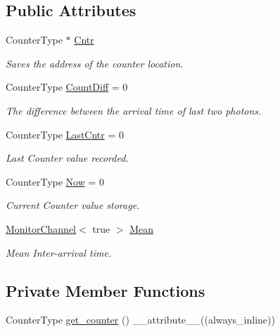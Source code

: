 \subsection*{Public Attributes}
\begin{DoxyCompactItemize}
\item 
Counter\+Type $\ast$ \hyperlink{classInterArrivalTime_a6873d0052064c8db918fd0a813524c6f}{Cntr}
\begin{DoxyCompactList}\small\item\em Saves the address of the counter location. \end{DoxyCompactList}\item 
Counter\+Type \hyperlink{classInterArrivalTime_ac73e4d6bbfc5daea67b53723ede5e9fd}{Count\+Diff} = 0
\begin{DoxyCompactList}\small\item\em The difference between the arrival time of last two photons. \end{DoxyCompactList}\item 
Counter\+Type \hyperlink{classInterArrivalTime_a8a24e1acb445c45b2934955fb0dcc8f5}{Last\+Cntr} = 0
\begin{DoxyCompactList}\small\item\em Last Counter value recorded. \end{DoxyCompactList}\item 
Counter\+Type \hyperlink{classInterArrivalTime_aa0126b0de317f9b1b7660cfe305b5779}{Now} = 0
\begin{DoxyCompactList}\small\item\em Current Counter value storage. \end{DoxyCompactList}\item 
\hyperlink{classMonitorChannel}{Monitor\+Channel}$<$ true $>$ \hyperlink{classInterArrivalTime_a108e8d20e7a26f7b9b6ac75c38632cd0}{Mean}
\begin{DoxyCompactList}\small\item\em Mean Inter-\/arrival time. \end{DoxyCompactList}\end{DoxyCompactItemize}
\subsection*{Private Member Functions}
\begin{DoxyCompactItemize}
\item 
Counter\+Type \hyperlink{classInterArrivalTime_a64985dc80cad0a2e79718bad59ca7341}{get\+\_\+counter} () \+\_\+\+\_\+attribute\+\_\+\+\_\+((always\+\_\+inline))
\end{DoxyCompactItemize}



